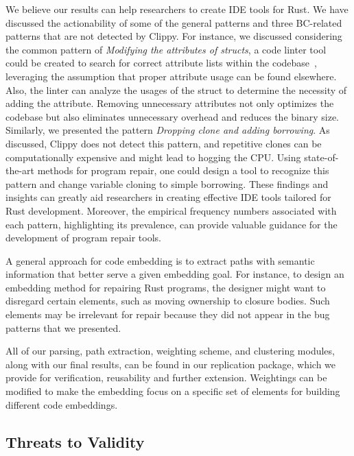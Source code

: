 We believe our results can help researchers to create IDE tools for Rust. We have discussed the actionability of some of the general patterns and three BC-related patterns that are not detected by Clippy. For instance, we discussed considering the common pattern of \textit{Modifying the attributes of structs}, a code linter tool could be created to search for correct attribute lists within the codebase~\citep{forrest2009genetic}, leveraging the assumption that proper attribute usage can be found elsewhere. Also, the linter can analyze the usages of the struct to determine the necessity of adding the attribute. Removing unnecessary attributes not only optimizes the codebase but also eliminates unnecessary overhead and reduces the binary size. Similarly, we presented the pattern \textit{Dropping clone and adding borrowing}. As discussed, Clippy does not detect this pattern, and repetitive clones can be computationally expensive and might lead to hogging the CPU. Using state-of-the-art methods for program repair, one could design a tool to recognize this pattern and change variable cloning to simple borrowing. These findings and insights can greatly aid researchers in creating effective IDE tools tailored for Rust development. Moreover, the empirical frequency numbers associated with each pattern, highlighting its prevalence, can provide valuable guidance for the development of program repair tools.

A general approach for code embedding is to extract paths with semantic information that better serve a given embedding goal. For instance, to design an embedding method for repairing Rust programs, the designer might want to disregard certain elements, such as moving ownership to closure bodies. Such elements may be irrelevant for repair because they did not appear in the bug patterns that we presented.

All of our parsing, path extraction, weighting scheme, and clustering modules, along with our final results, can be found in our replication package, which we provide for verification, reusability and further extension. Weightings can be modified to make the embedding focus on a specific set of elements for building different code embeddings.

\subsection{Threats to Validity}

